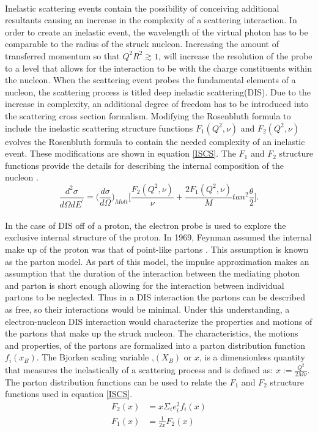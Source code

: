 \paragraph{}Inelastic scattering events contain the possibility of conceiving additional resultants causing an increase in the complexity of a scattering interaction. In order to create an inelastic event, the wavelength of the virtual photon has to be comparable to the radius of the struck nucleon. Increasing the amount of transferred momentum so that $Q^2R^2 \gtrsim 1$, will increase the resolution of the probe to a level that allows for the interaction to be with the charge constituents within the nucleon. When the scattering event probes the fundamental elements of a nucleon, the scattering process is titled deep inelastic scattering(DIS). Due to the increase in complexity, an additional degree of freedom has to be introduced into the scattering cross section formalism. Modifying the Rosenbluth formula to include the inelastic scattering structure functions $F_1(Q^2,\nu)$ and $F_2(Q^2,\nu)$ evolves the Rosenbluth formula to contain the needed complexity of an inelastic event. These modifications are shown in equation \ref{ISCS}. The $F_1$ and $F_2$ structure functions provide the details for describing the internal composition of the nucleon \cite{PnN}. 
\begin{equation}
\label{ISCS}
\frac{d^2\sigma}{d\Omega dE^\prime}=\bigg(\frac{d\sigma}{d\Omega}\bigg)_{Mott} \bigg\lbrack \frac{F_2(Q^2,\nu)}{\nu} + \frac{2F_1(Q^2,\nu)}{M}tan^2\frac{\theta}{2} \bigg \rbrack.
\end{equation}  
\paragraph{}In the case of DIS off of a proton, the electron probe is used to explore the exclusive internal structure of the proton. In 1969, Feynman assumed the internal make up of the proton was that of point-like partons \cite{Briskin_thesis,DISproton}. This assumption is known as the parton model. As part of this model, the impulse approximation makes an assumption that the duration of the interaction between the mediating photon and parton is short enough allowing for the interaction between individual partons to be neglected. Thus in a DIS interaction the partons can be described as free, so their interactions would be minimal. Under this understanding, a electron-nucleon DIS interaction would characterize the properties and motions of the partons that make up the struck nucleon\cite{DISproton}. The characteristics, the motions and properties, of the partons are formalized into a parton distribution function $f_i(x_B)$. The Bjorken scaling variable ,$(X_B)$ or $x$, is a dimensionless quantity that measures the inelastically of a scattering process and is defined as: $x := \frac{Q^2}{2M\nu}$. The parton distribution functions can be used to relate the $F_1$ and $F_2$ structure functions used in equation \ref{ISCS}. 
\begin{align}
F_2(x) &= x \Sigma_i e^2_i f_i(x)\\
F_1(x) &= \frac{1}{2x} F_2(x)
\end{align}


